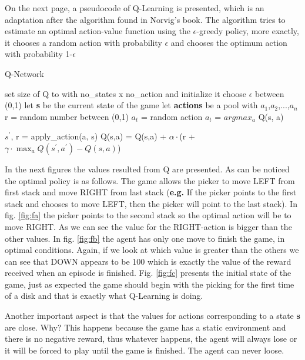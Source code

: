 On the next page, a pseudocode of Q-Learning is presented, which is an adaptation after the algorithm found in Norvig's book{\cite{norvig}}. The algorithm tries to estimate an optimal action-value function using the $\epsilon$-greedy policy, more exactly, it chooses a random action with probability $\epsilon$ and chooses the optimum action with probability 1-$\epsilon$
\newpage
\begin{algorithm}
	\caption{Q-Network} \label{alg-code}
	\begin{algorithmic}[1]
		\State set size of Q to with no_states x no_action and initialize it
		\State choose $\epsilon$ between (0,1)
		\State let \textbf{s} be the current state of the game
		\State let \textbf{actions} be a pool with {$a_1$,$a_2$,...,$a_n$}
			\State r = random number between (0,1)
				\State $a_t$ = random action
			\Else
				\State $a_t$ = $argmax_a$ Q(s, a)
			\EndIf
			
			\State $s^\prime$, r = apply_action(a, s)
			\State Q(s,a) = Q(s,a) + $\alpha\cdot$(r + $\gamma\cdot \max_a Q(s^\prime,a^\prime)-Q(s,a)$)
		\EndWhile
	\end{algorithmic}
\end{algorithm}

In the next figures the values resulted from Q are presented. As can be noticed the optimal policy is as follows. The game allows the picker to move LEFT from first stack and move RIGHT from last stack (\textbf{e.g.} If the picker points to the first stack and chooses to move LEFT, then the picker will point to the last stack). In fig. \ref{fig:fa} the picker points to the second stack so the optimal action will be to move RIGHT. As we can see the value for the RIGHT-action is bigger than the other values. In fig. \ref{fig:fb} the agent has only one move to finish the game, in optimal conditions. Again, if we look at which value is greater than the others we can see that DOWN appears to be 100 which is exactly the value of the reward received when an episode is finished. Fig. \ref{fig:fc} presents the initial state of the game, just as expected the game should begin with the picking for the first time of a disk and that is exactly what Q-Learning is doing.

Another important aspect is that the values for actions corresponding to a state \textbf{s} are close. Why? This happens because the game has a static environment and there is no negative reward, thus whatever happens, the agent will always lose or it will be forced to play until the game is finished. The agent can never loose.

